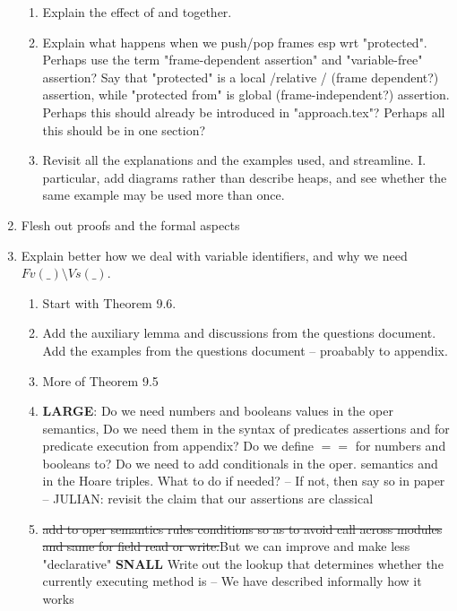 \documentclass[acmsmall,review,anonymous]{acmart}\settopmatter{printfolios=true}
\begin{document}
\begin{enumerate}
\begin{enumerate}
\item
Explain the effect of {} and {}  together. 
\item
Explain what happens when we push/pop frames esp wrt "protected".  Perhaps use the term "frame-dependent assertion" and "variable-free" assertion? Say that "protected" is a local /relative / (frame dependent?) assertion, while "protected from" is global (frame-independent?) assertion. Perhaps this should already be introduced in "approach.tex"?
Perhaps all this should be in one section?

\item
Revisit all the explanations and the examples used, and streamline. I. particular, add diagrams rather than describe heaps, and see whether the same example may be used more than once.
\end{enumerate}

\item
Flesh out  proofs and the formal aspects

\item
Explain better how we deal with variable identifiers, and why we need $Fv(\_)\setminus Vs(\_)$.
\begin{enumerate}
\item
Start with Theorem 9.6.  

\item
Add the auxiliary lemma and discussions from the questions document. Add the examples from the questions document -- proabably to appendix. 

\item
More of Theorem 9.5

\item
\textbf{LARGE}: Do we need numbers and booleans values in the oper semantics, 
Do we need them in the syntax of predicates assertions and for predicate execution from appendix?
Do we define $==$ for numbers and booleans to?  
Do we need to add conditionals in the oper. semantics and in the Hoare triples. What to do if needed?
--
If not, then say so in paper
--
JULIAN: revisit the claim that our assertions are classical

\item
\st{add to oper semantics rules conditions so as to avoid call across modules and same for field read or write.}But we can improve and make less "declarative" {\textbf{SNALL}} Write out the lookup that determines  whether the currently executing  method is  -- We have described informally how it works



\end{enumerate}
\end{enumerate}
\end{document}
